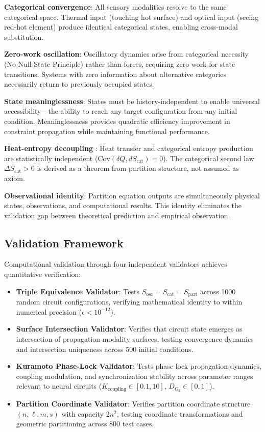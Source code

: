 \documentclass[aps,prd,twocolumn,superscriptaddress,floatfix,nofootinbib]{revtex4-2}
\theoremstyle{remark}
\begin{document}
\textbf{Categorical convergence}: All sensory modalities resolve to the same categorical space. Thermal input (touching hot surface) and optical input (seeing red-hot element) produce identical categorical states, enabling cross-modal substitution.

\textbf{Zero-work oscillation}: Oscillatory dynamics arise from categorical necessity (No Null State Principle) rather than forces, requiring zero work for state transitions. Systems with zero information about alternative categories necessarily return to previously occupied states.

\textbf{State meaninglessness}: States must be history-independent to enable universal accessibility—the ability to reach any target configuration from any initial condition. Meaninglessness provides quadratic efficiency improvement in constraint propagation while maintaining functional performance.

\textbf{Heat-entropy decoupling} : Heat transfer and categorical entropy production are statistically independent ($\text{Cov}(\delta Q, d S_{\text{cat}}) = 0$). The categorical second law $\Delta S_{\text{cat}} > 0$ is derived as a theorem from partition structure, not assumed as axiom.

\textbf{Observational identity}: Partition equation outputs are simultaneously physical states, observations, and computational results. This identity eliminates the validation gap between theoretical prediction and empirical observation.

\subsection{Validation Framework}

Computational validation through four independent validators achieves quantitative verification:

\begin{itemize}
\item \textbf{Triple Equivalence Validator}: Tests $S_{\text{osc}} = S_{\text{cat}} = S_{\text{part}}$ across 1000 random circuit configurations, verifying mathematical identity to within numerical precision ($\epsilon < 10^{-12}$).

\item \textbf{Surface Intersection Validator}: Verifies that circuit state emerges as intersection of propagation modality surfaces, testing convergence dynamics and intersection uniqueness across 500 initial conditions.

\item \textbf{Kuramoto Phase-Lock Validator}: Tests phase-lock propagation dynamics, coupling modulation, and synchronization stability across parameter ranges relevant to neural circuits ($K_{\text{coupling}} \in [0.1, 10]$, $D_{O_2} \in [0, 1]$).

\item \textbf{Partition Coordinate Validator}: Verifies partition coordinate structure $(n, \ell, m, s)$ with capacity $2n^2$, testing coordinate transformations and geometric partitioning across 800 test cases.
\end{itemize}
\end{document}
